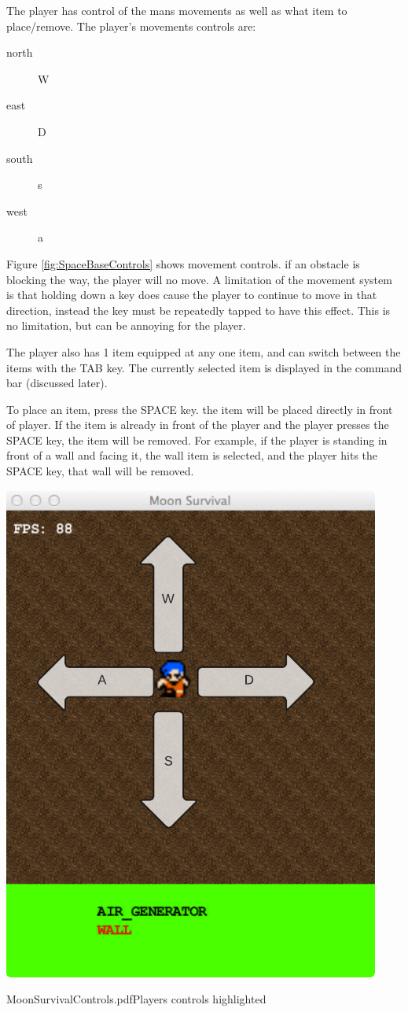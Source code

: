 The player has control of the mans movements as well as what item to place/remove.
The player's movements controls are:
\begin{description}
\item [north] W
\item [east] D
\item [south] s
\item [west] a
\end{description}
Figure \ref{fig:SpaceBaseControls} shows movement controls.
if an obstacle is blocking the way, the player will no move.
A limitation of the movement system is that holding down a key does cause the player to continue to move in that direction, instead the key must be repeatedly tapped to have this effect. This is no limitation, but can be annoying for the player.

The player also has 1 item equipped at any one item, and can switch between the items with the TAB key. The currently selected item is displayed in the command bar (discussed later).

To place an item, press the SPACE key. the item will be placed directly in front of player. 
If the item is already in front of the player and the player presses the SPACE key, the item will be removed.
For example, if the player is standing in front of a wall and facing it, the wall item is selected, and the player hits the SPACE key, that wall will be removed.

\begin{marginfigure}
	\includegraphics{res/space_base_prototype/MoonSurvivalControls.pdf}
	\caption{MoonSurvivalControls.pdfPlayers controls highlighted}
	\label{fig:SpaceBaseControls}
\end{marginfigure}


